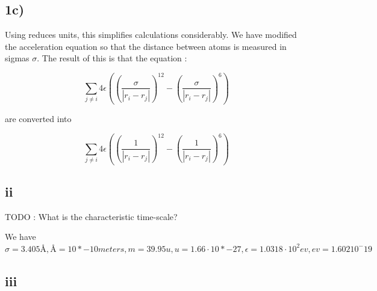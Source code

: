 \subsection*{1c)}
Using reduces units, this simplifies calculations considerably. We have modified the acceleration equation so that the distance between atoms is measured in sigmas $\sigma$. The result of this is that the equation :

\begin{equation}
  \sum_{j \neq i} 4\epsilon \left(   (\frac{\sigma}{| r_i - r_j | })^{12} -   (\frac{\sigma}{| r_i - r_j | })^6 \right)
\end{equation}

are converted into 

\begin{equation}
  \sum_{j \neq i} 4\epsilon \left(   (\frac{1}{| r_i - r_j | })^{12} -   (\frac{1}{| r_i - r_j | })^6 \right)
\end{equation}

\subsection*{ii}
TODO : What is the characteristic time-scale?

We have $\sigma = 3.405 Å, Å = 10*{-10}meters,  m = 39.95 u, u = 1.66 \cdot 10*{-27}, \epsilon = 1.0318 \cdot 10^2 ev,  ev = 1.602 10^-{19}$


\subsection*{iii}

